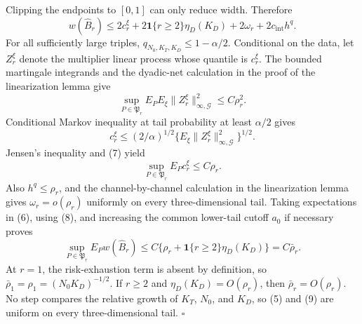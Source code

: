 Clipping the endpoints to \([0,1]\) can only reduce width.  Therefore
\[
 w(\widehat B_r)
 \le2c_r^\xi+2\mathbf 1\{r\ge2\}\eta_D(K_D)
      +2\omega_r+2c_{\mathrm{int}}h^q.                     \tag{6}
\]
For all sufficiently large triples,
\(q_{N_0,K_T,K_D}\le1-\alpha/2\).  Conditional on the data, let
\(Z_r^\xi\) denote the multiplier linear process whose quantile is
\(c_r^\xi\).  The bounded martingale integrands and the dyadic-net
calculation in the proof of the linearization lemma give
\[
 \sup_{P\in\mathfrak P_r}E_P E_\xi
       \|Z_r^\xi\|_{\infty,\mathcal G}^2\le C\rho_r^2.       \tag{7}
\]
Conditional Markov inequality at tail probability at least \(\alpha/2\)
gives
\[
 c_r^\xi\le (2/\alpha)^{1/2}
       \{E_\xi\|Z_r^\xi\|_{\infty,\mathcal G}^2\}^{1/2}.
\]
Jensen's inequality and (7) yield
\[
 \sup_{P\in\mathfrak P_r}E_Pc_r^\xi\le C\rho_r.             \tag{8}
\]
Also \(h^q\le\rho_r\), and the channel-by-channel calculation in the
linearization lemma gives \(\omega_r=o(\rho_r)\) uniformly on every
three-dimensional tail.  Taking expectations in (6), using (8), and
increasing the common lower-tail cutoff \(a_0\) if necessary proves
\[
 \sup_{P\in\mathfrak P_r}E_Pw(\widehat B_r)
 \le C\{\rho_r+\mathbf 1\{r\ge2\}\eta_D(K_D)\}
 =C\bar\rho_r.                                               \tag{9}
\]
At \(r=1\), the risk-exhaustion term is absent by definition, so
\(\bar\rho_1=\rho_1=(N_0K_D)^{-1/2}\).  If \(r\ge2\) and
\(\eta_D(K_D)=O(\rho_r)\), then \(\bar\rho_r=O(\rho_r)\).
No step compares the relative growth of \(K_T\), \(N_0\), and \(K_D\), so
(5) and (9) are uniform on every three-dimensional tail. \(\square\)